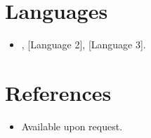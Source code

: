 \documentclass[11pt,a4paper,sans]{moderncv}
\begin{document}
\section{Languages}
\vspace{1pt}
\begin{itemize}
\item [Language 1], [Language 2], [Language 3].
\end{itemize}

\section{References}
\vspace{1pt}
\begin{itemize}
\item{Available upon request.}
\end{itemize}
\end{document}
